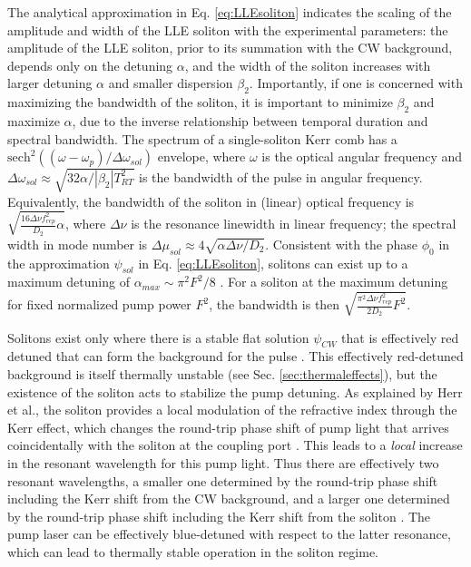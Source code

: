 The analytical approximation in Eq. \ref{eq:LLEsoliton} indicates the scaling of the amplitude and width of the LLE soliton with the experimental parameters: the amplitude of the LLE soliton, prior to its summation with the CW background, depends only on the detuning $\alpha$, and the width of the soliton increases with larger detuning $\alpha$ and smaller dispersion $\beta_2$. Importantly, if one is concerned with maximizing the bandwidth of the soliton, it is important to minimize $\beta_2$ and maximize $\alpha$, due to the inverse relationship between temporal duration and spectral bandwidth. The spectrum of a single-soliton Kerr comb has a $\mathrm{sech}^2\left((\omega-\omega_p)/\Delta \omega_{sol}\right)$ envelope, where $\omega$ is the optical angular frequency and $\Delta\omega_{sol}\approx\sqrt{32\alpha/|\beta_2| T_{RT}^2 }$ is the bandwidth of the pulse in angular frequency. Equivalently, the bandwidth of the soliton in (linear) optical frequency is $\sqrt{\frac{16\Delta\nu f_{rep}^2}{D_2}\alpha}$, where $\Delta\nu$ is the resonance linewidth in linear frequency; the spectral width in mode number is $\Delta\mu_{sol}\approx4\sqrt{\alpha\Delta\nu/D_2}$. Consistent with the phase $\phi_0$ in the approximation $\psi_{sol}$ in Eq. \ref{eq:LLEsoliton}, solitons can exist up to a maximum detuning of $\alpha_{max}\sim\pi^2 F^2/8$ \cite{Herr2014}. For a soliton at the maximum detuning for fixed normalized pump power $F^2$, the bandwidth is then $\sqrt{\frac{\pi^2\Delta\nu f_{rep}^2}{2 D_2}F^2}$. 

Solitons exist only where there is a stable flat solution $\psi_{CW}$ that is effectively red detuned that can form the background for the pulse \cite{Barashenkov1996,Coen2013}. This effectively red-detuned background is itself thermally unstable (see Sec. \ref{sec:thermaleffects}), but the existence of the soliton acts to stabilize the pump detuning. As explained by Herr et al., the soliton provides a local modulation of the refractive index through the Kerr effect, which changes the round-trip phase shift of pump light that arrives coincidentally with the soliton at the coupling port \cite{Herr2014}. This leads to a \textit{local} increase in the resonant wavelength for this pump light. Thus there are effectively two resonant wavelengths, a smaller one determined by the round-trip phase shift including the Kerr shift from the CW background, and a larger one determined by the round-trip phase shift including the Kerr shift from the soliton \cite{Guo2017a}. The pump laser can be effectively blue-detuned with respect to the latter resonance, which can lead to thermally stable operation in the soliton regime.

